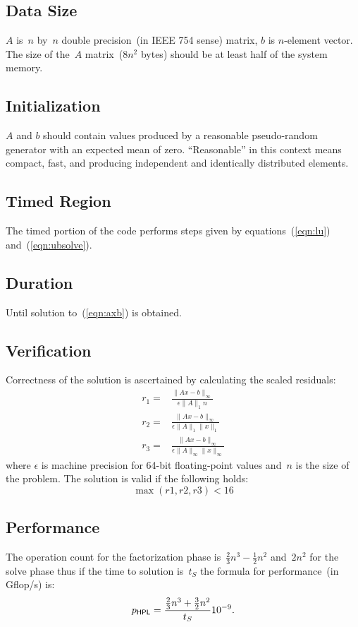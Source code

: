 \documentclass[twocolumn,draft]{article}
\newcommand{\hpl}{\textsf{\scriptsize HPL}\xspace}
\begin{document}
\subsection{Data Size}
$A$ is~$n$ by~$n$ double precision~(in IEEE 754 sense) matrix, $b$ is $n$-element
vector. The size of the~$A$ matrix~($8n^2$ bytes) should be at least half of
the system memory.

\subsection{Initialization}
$A$ and $b$ should contain values produced by a reasonable pseudo-random
generator with an expected mean of zero. ``Reasonable'' in this context means
compact, fast, and producing independent and identically distributed elements.

\subsection{Timed Region}
The timed portion of the code performs steps given by equations~(\ref{eqn:lu})
and~(\ref{eqn:ubsolve}).

\subsection{Duration}
Until solution to~(\ref{eqn:axb}) is obtained.

\subsection{Verification}
Correctness of the solution is ascertained by calculating the scaled residuals:
\begin{eqnarray}
r_1 = & \frac{\|Ax-b\|_{\infty}}{\epsilon \|A\|_1 n} \\
r_2 = &\frac{\|Ax-b\|_{\infty}}{\epsilon \|A\|_1 \|x\|_1} \\
r_3 = &\frac{\|Ax-b\|_{\infty}}{\epsilon \|A\|_{\infty} \|x\|_{\infty}}
\end{eqnarray}
where $\epsilon$ is machine precision for 64-bit floating-point values and~$n$
is the size of the problem. The solution is valid if the following holds:
\begin{equation}
  \max(r1, r2, r3) < 16
\end{equation}

\subsection{Performance}
The operation count for the factorization phase
is~$\frac{2}{3}n^3-\frac{1}{2}n^2$ and~$2n^2$ for the solve phase thus if the
time to solution is~$t_S$ the formula for performance~(in Gflop/s) is:
\begin{equation}
  p_{\hpl}=\frac{\frac{2}{3}n^3+\frac{3}{2}n^2}{t_S}10^{-9}.
\end{equation}
\end{document}
